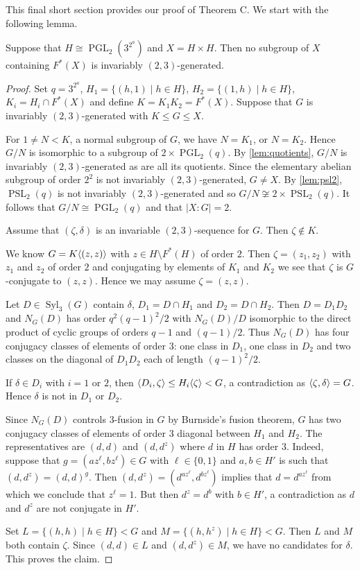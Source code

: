 \documentclass[12pt,a4paper]{amsart}
\DeclareMathOperator{\Syl}{Syl}
\DeclareMathOperator{\PGL}{PGL}
\DeclareMathOperator{\PSL}{PSL}
\DeclarePairedDelimiter{\gen}{\langle}{\rangle}
\begin{document}
This final short section provides our proof of Theorem C.
We start with the following lemma.

\begin{lemma}\label{lem:no repeated factors}
Suppose that $H \cong \PGL_2(3^{2^a})$ and   $X= H\times H$. Then no subgroup of $X$ containing $F^*(X)$ is invariably $(2,3)$-generated.
\end{lemma}

\begin{proof} Set $q=3^{2^a}$,   $H_1=\{(h,1)\mid h \in H\}$, $H_2=  \{(1,h)\mid h \in H\}$, $K_i = H_i \cap F^*(X)$ and define $K=K_1K_2=F^*(X)$.
Suppose that $G$ is invariably $(2,3)$-generated with $K \le G \le X$.



 For $1\ne N<K$, a  normal subgroup of $G$, we have $N= K_1$, or $N= K_2$.  Hence $G/N$ is isomorphic to a subgroup of $2 \times \PGL_2(q)$.  By \cref{lem:quotients}, $G/N$ is invariably $(2,3)$-generated as are all its quotients. Since the elementary abelian subgroup of order $2^2$ is not invariably $(2,3)$-generated,  $G \ne X$. By  \cref{lem:psl2}, $\PSL_2(q)$ is not invariably $(2,3)$-generated and so $G/N \not \cong 2 \times \PSL_2(q)$. It follows that $G/N \cong \PGL_2(q)$ and that $|X:G|=2$.

Assume that $(\zeta,\delta)$ is an invariable $(2,3)$-sequence for $G$. Then $\zeta \not \in K$.

   We know $G = K\gen{(z,z)}$ with $z\in H\setminus F^*(H)$ of order $2$. Then $\zeta=(z_1,z_2)$ with $z_1$ and $z_2$ of order $2$ and conjugating by elements of $K_1$ and $K_2$ we see that $\zeta$ is $G$-conjugate to $(z,z)$. Hence we may assume $\zeta=(z,z)$.

      Let $D \in \Syl_3(G)$ contain $\delta$, $D_1= D\cap H_1$ and $D_2=D\cap H_2$. Then $D=D_1D_2$ and $N_G(D)$ has order $q^2(q-1)^2/2$ with $N_G(D)/D$ isomorphic to the direct product of  cyclic groups of orders $q-1$ and $(q-1)/2$. Thus $N_G(D  )$ has four conjugacy classes of elements of order $3$: one class in $D_1$, one class in $D_2$ and two classes on the diagonal of $D_1D_2$ each of length $(q-1)^2/2$.


      If $\delta \in D_i$ with $i=1$ or $2$,  then $\langle D_i,\zeta \rangle \le H_i\gen{\zeta} < G$, a contradiction as $\gen{\zeta,\delta}= G$.   Hence $\delta$ is not in $D_1$ or $D_2$.

      Since $N_G(D)$ controls $3$-fusion in $G$ by Burnside's fusion theorem, $G$ has two conjugacy classes of elements of order $3$  diagonal between $H_1$ and $H_2$. The representatives are $(d,d)$ and $(d,d^z)$ where $d$ in $H$ has order $3$. Indeed, suppose that $g=(az^\ell,bz^\ell) \in G$ with $\ell \in \{0,1\}$ and $a,b \in H'$ is such that $(d,d^z)=(d,d)^g$.
      Then $(d,d^z) = (d^{az^\ell},d^{bz^\ell})$ implies that $d= d^{az^\ell}$ from which we conclude that $z^{\ell}=1$. But then $d^z=d^b$ with $b \in H'$, a contradiction as $d$ and $d^z$ are not conjugate in $H'$.

   Set $L= \{(h,h) \mid h \in H\}< G$ and $M= \{(h,h^z) \mid h \in H\}<G$. Then $L$ and $M$ both contain $\zeta $. Since $(d,d) \in L$ and $(d,d^z) \in M$, we have no candidates for $\delta$. This proves the claim.
\end{proof}
\end{document}
